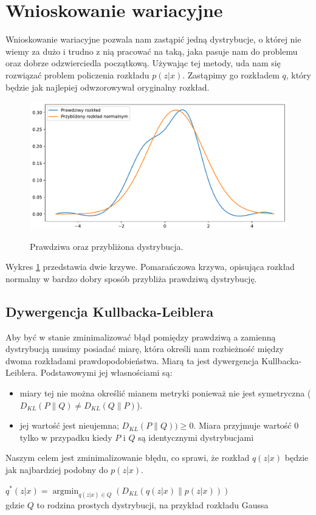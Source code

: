 \documentclass[a4paper,12pt]{book} %
\begin{document}
\section{Wnioskowanie wariacyjne}
Wnioskowanie wariacyjne pozwala nam zastąpić jedną dystrybucje, o której nie wiemy za dużo i trudno z nią pracować na taką, jaka pasuje nam do problemu oraz dobrze odzwierciedla początkową. Używając tej metody, uda nam się rozwiązać problem policzenia rozkładu $p(z|x)$. Zastąpimy go rozkładem $q$, który będzie jak najlepiej odwzorowywał oryginalny rozkład. 
\begin{figure}[h!]
	\centering
	\includegraphics[width=12cm]{approximate.pdf}
	\label{fig:approximate}
	\caption{Prawdziwa oraz przybliżona dystrybucja.}
\end{figure} 

Wykres \ref{fig:approximate} przedstawia dwie krzywe. Pomarańczowa krzywa, opisująca rozkład normalny w bardzo dobry sposób przybliża prawdziwą dystrybucję.
\subsection{Dywergencja Kullbacka-Leiblera}
Aby być w stanie zminimalizować błąd pomiędzy prawdziwą a zamienną dystrybucją musimy posiadać miarę, która określi nam rozbieżność między dwoma rozkładami prawdopodobieństwa. Miarą ta jest dywergencja Kullbacka-Leiblera. Podstawowymi jej własnościami są:
\begin{itemize}
	\item miary tej nie można określić mianem metryki ponieważ nie jest symetryczna ($D_{KL}(P\|Q)\neq D_{KL}(Q\|P)$).
	\item jej wartość jest nieujemna; $D_{KL}(P\|Q)) \geq 0$. Miara przyjmuje wartość 0 tylko w przypadku kiedy $P$ i $Q$ są identycznymi dystrybucjami
\end{itemize}
Naszym celem jest zminimalizowanie błędu, co sprawi, że rozkład $q(z|x)$ będzie jak najbardziej podobny do $p(z|x)$.
\begin{center}
	$q^\ast(z|x)=\operatorname*{argmin}_{q(z|x)\in Q}(D_{KL}(q(z|x)\|p(z|x)))$
	\\gdzie $Q$ to rodzina prostych dystrybucji, na przykład rozkładu Gaussa 
\end{center}
\end{document}
